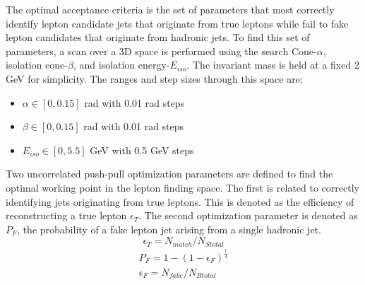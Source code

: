  The optimal acceptance criteria is the  set of parameters that most correctly identify lepton candidate jets that originate from true leptons while fail to fake lepton candidates that originate from hadronic jets. To find this set of parameters, a scan over a 3D space is performed using the search Cone-$\alpha$, isolation cone-$\beta$, and isolation energy-$E_{iso}$. The invariant mass is held at a fixed 2 GeV for simplicity. The ranges and step sizes through this space are:
 \begin{itemize}
 \item $\alpha \in [0,0.15]$ rad with 0.01 rad steps
 \item $\beta \in [0,0.15]$ rad with 0.01 rad steps
 \item $E_{iso} \in [0,5.5]$ GeV with 0.5 GeV steps
 \end{itemize}
Two uncorrelated push-pull optimization parameters are defined to find the optimal working point in the lepton finding space. The first is related to correctly identifying jets originating from true leptons. This is denoted as the efficiency of reconstructing a true lepton $\epsilon_T$. The second optimization parameter is denoted as $P_F$, the probability of a fake lepton jet arising from a single hadronic jet.  
\begin{equation}
\label{eq:et}
\epsilon_T = N_{match}/N_{Stotal}
\end{equation}
\begin{equation}
\begin{split}
\label{eq:pf}
P_F = 1-(1-\epsilon_F)^{\frac{1}{4}} \\
\epsilon_F = N_{fake}/N_{Btotal}
\end{split}
\end{equation}
